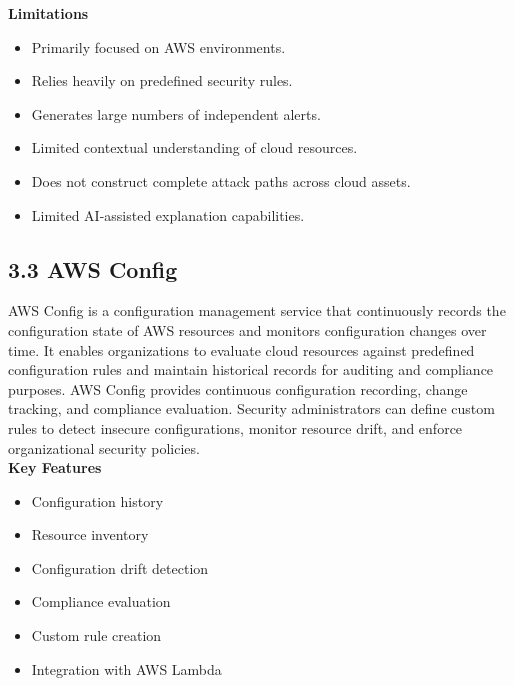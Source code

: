 \textbf{Limitations}

\begin{itemize}
\tightlist
\item
  Primarily focused on AWS environments.\\
\item
  Relies heavily on predefined security rules.\\
\item
  Generates large numbers of independent alerts.\\
\item
  Limited contextual understanding of cloud resources.\\
\item
  Does not construct complete attack paths across cloud assets.\\
\item
  Limited AI-assisted explanation capabilities.
\end{itemize}

\subsection{3.3 AWS Config}

AWS Config is a configuration management service that continuously records the configuration state of AWS resources and monitors configuration changes over time. It enables organizations to evaluate cloud resources against predefined configuration rules and maintain historical records for auditing and compliance purposes. AWS Config provides continuous configuration recording, change tracking, and compliance evaluation. Security administrators can define custom rules to detect insecure configurations, monitor resource drift, and enforce organizational security policies.\\
\textbf{Key Features}

\begin{itemize}
\tightlist
\item
  Configuration history\\
\item
  Resource inventory\\
\item
  Configuration drift detection\\
\item
  Compliance evaluation\\
\item
  Custom rule creation\\
\item
  Integration with AWS Lambda
\end{itemize}

